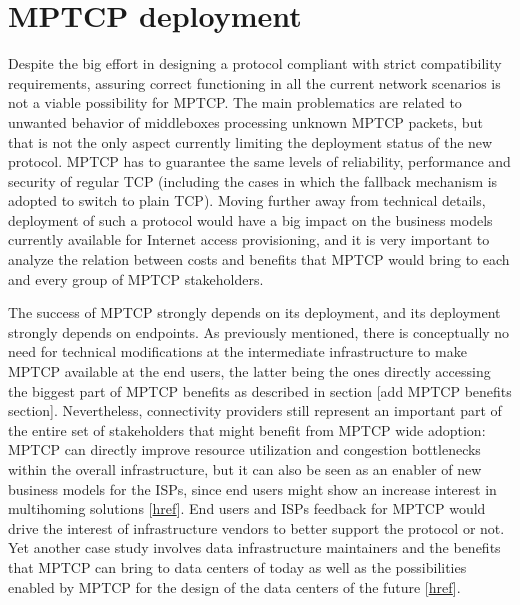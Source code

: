 \section{MPTCP deployment}
Despite the big effort in designing a protocol compliant with strict compatibility requirements, assuring correct functioning in all the current network scenarios is not a viable possibility for MPTCP. The main problematics are related to unwanted behavior of middleboxes processing unknown MPTCP packets, but that is not the only aspect currently limiting the deployment status of the new protocol. MPTCP has to guarantee the same levels of reliability, performance and security of regular TCP (including the cases in which the fallback mechanism is adopted to switch to plain TCP). Moving further away from technical details, deployment of such a protocol would have a big impact on the business models currently available for Internet access provisioning, and it is very important to analyze the relation between costs and benefits that MPTCP would bring to each and every group of MPTCP stakeholders.


The success of MPTCP strongly depends on its deployment, and its deployment strongly depends on endpoints. As previously mentioned, there is conceptually no need for technical modifications at the intermediate infrastructure to make MPTCP available at the end users, the latter being the ones directly accessing the biggest part of MPTCP benefits as described in section [add MPTCP benefits section]. Nevertheless, connectivity providers still represent an important part of the entire set of stakeholders that might benefit from MPTCP wide adoption: MPTCP can directly improve resource utilization and congestion bottlenecks within the overall infrastructure, but it can also be seen as an enabler of new business models for the ISPs, since end users might show an increase interest in multihoming solutions [\href{https://books.google.de/books?id=ECBxhiURlKYC&pg=PA23&lpg=PA23&dq=mptcp+deployment&source=bl&ots=_cvPxxdH6K&sig=P5AlF9bU_iE3C63HfXvgD77tUg8&hl=en&sa=X&ved=0ahUKEwi0wMnuscfKAhUB1hQKHT0cARsQ6AEIUzAI#v=onepage&q&f=false}{href}]. End users and ISPs feedback for MPTCP would drive the interest of infrastructure vendors to better support the protocol or not. 
Yet another case study involves data infrastructure maintainers and the benefits that MPTCP can bring to data centers of today as well as the possibilities enabled by MPTCP for the design of the data centers of the future [\href{http://conferences.sigcomm.org/sigcomm/2011/papers/sigcomm/p266.pdf}{href}].


